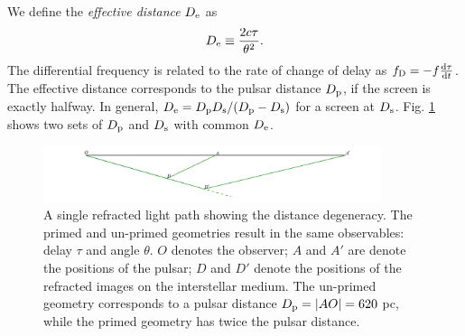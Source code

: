 \documentclass[useAMS,usenatbib]{mn2e}
\begin{document}
We define the {\it effective distance} $D_{\rm e}$ as
\begin{equation}
D_{\rm e} \equiv \frac{2c\tau}{\theta^2}.
\end{equation}
The differential frequency is related to the rate of change of delay
as $f_{\rm D}  =-f\frac{\rm d\tau}{\operatorname{d \!} t}$.  The effective distance
corresponds to the pulsar distance $D_{\rm p}$, if the screen is exactly halfway.
In general, $D_{\rm e}={D_{\rm p} D_{\rm s}}/({D_{\rm p} - D_{\rm
    s}})$ for a screen at $D_{\rm s}$.  Fig. \ref{fig:Singledegeneracy} shows two sets of $D_{\rm p}$ and $D_{\rm s}$ with common $D_{\rm e}$.

\begin{figure}
\centering
\hspace*{-0.4in}\includegraphics[width=3.9in]{single_degeneracy.pdf}
\caption{A single refracted light path showing the distance
  degeneracy.  The primed and un-primed geometries result in the same
  observables: delay $\tau$ and angle $\theta$.
$O$ denotes the observer; $A$ and $A'$ are denote the positions of the
pulsar; $D$ and $D'$ denote the positions of the refracted images on the
interstellar medium. The un-primed geometry corresponds to a pulsar
distance $D_{\rm p} = |AO| = 620$ pc, while the primed geometry has twice the
pulsar distance.}
\label{fig:Singledegeneracy}
\end{figure}


\end{document}
